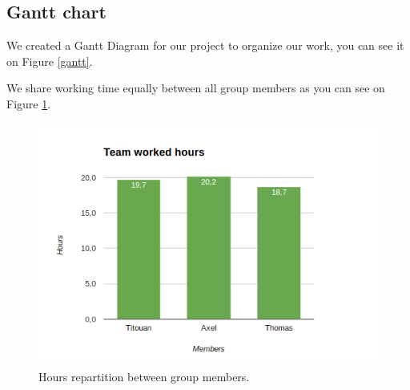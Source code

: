 \documentclass[a4paper,11pt]{article}
\begin{document}
\subsection{Gantt chart}

We created a Gantt Diagram for our project to organize our work, you can see it on Figure \ref{gantt}.

\begin{landscape}

\parbox[c][\textwidth][s]{\linewidth}{%
\vfill
{}
\label{gantt}
\vfill
}
\end{landscape}

We share working time equally between all group members as you can see on Figure \ref{gantt_hours}.

\begin{figure}[ht]
\centering
\includegraphics[scale=0.5]{images/gantt_hours.png}
\caption{Hours repartition between group members.}
\label{gantt_hours}
\end{figure}
\end{document}
